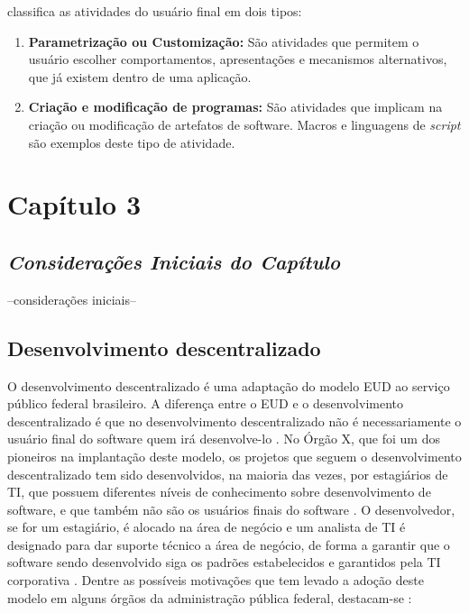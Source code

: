 classifica as atividades do usuário final em dois tipos:

\begin{enumerate}
\item \textbf{Parametrização ou Customização:} São atividades que permitem o usuário escolher comportamentos, apresentações e mecanismos  alternativos, que já existem dentro de uma aplicação.

\item \textbf{Criação e modificação de programas:} São atividades que implicam na criação ou modificação de artefatos de software. Macros e linguagens de \textit{script} são exemplos deste tipo de atividade.
\end{enumerate}

\chapter[Capítulo 3]{Capítulo 3}

\section{\textit{Considerações Iniciais do Capítulo}}
--considerações iniciais--

\section{Desenvolvimento descentralizado}

O desenvolvimento descentralizado é uma adaptação do modelo EUD ao serviço público federal brasileiro. A diferença entre o EUD e o desenvolvimento descentralizado é que no desenvolvimento descentralizado não é necessariamente o usuário final do software quem irá desenvolve-lo \cite{artigoTcuGovTI}. No Órgão X, que foi um dos pioneiros na implantação deste modelo, os projetos que seguem o desenvolvimento descentralizado tem sido desenvolvidos, na maioria das vezes, por estagiários de TI, que possuem diferentes níveis de conhecimento sobre desenvolvimento de software, e que também não são os usuários finais do software \cite{artigoTcuGovTI}. O desenvolvedor, se for um estagiário, é alocado na área de negócio e um analista de TI é designado para dar suporte técnico a área de negócio, de forma a garantir que o software sendo desenvolvido siga os padrões estabelecidos e garantidos pela TI corporativa \cite{artigoTcuGovTI}.
Dentre as possíveis motivações que tem levado a adoção deste modelo em alguns órgãos da administração pública federal, destacam-se \cite{slideTCU}:

